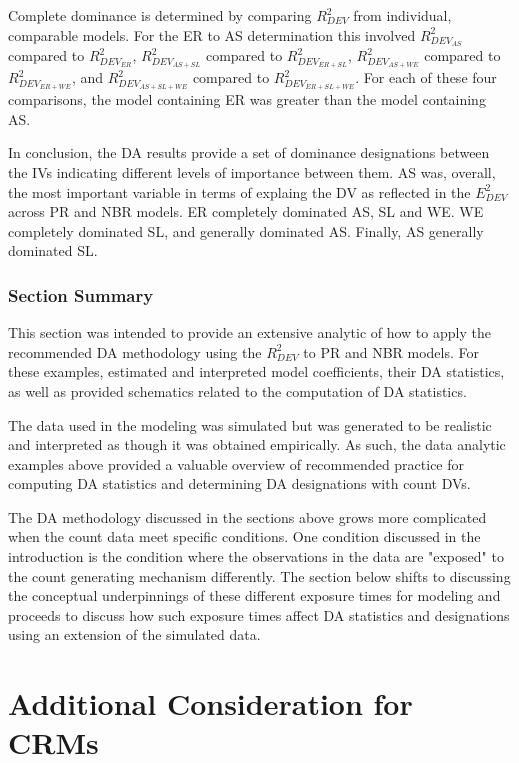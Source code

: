 \documentclass[ShortAfour,times,sageapa]{sagej}
\begin{document}
	Complete dominance is determined by comparing $R^2_{DEV}$ from individual, comparable models.
	For the ER to AS determination this involved $R^2_{DEV_{AS}}$ compared to $R^2_{DEV_{ER}}$, $R^2_{DEV_{AS + SL}}$ compared to $R^2_{DEV_{ER + SL}}$, $R^2_{DEV_{AS + WE}}$ compared to $R^2_{DEV_{ER + WE}}$, and $R^2_{DEV_{AS + SL + WE}}$ compared to $R^2_{DEV_{ER + SL + WE}}$.
	For each of these four comparisons, the model containing ER was greater than the model containing AS.
	
	In conclusion, the DA results provide a set of dominance designations between the IVs indicating different levels of importance between them. 
	AS was, overall, the most important variable in terms of explaing the DV as reflected in the $E^2_{DEV}$ across PR and NBR models. 
	ER completely dominated AS, SL and WE.
	WE completely dominated SL, and generally dominated AS.
	Finally, AS generally dominated SL.

	\subsubsection{Section Summary}
	
	This section was intended to provide an extensive analytic of how to apply the recommended DA methodology using the $R^2_{DEV}$ to PR and NBR models.
	For these examples, estimated and interpreted model coefficients, their DA statistics, as well as provided schematics related to the computation of DA statistics.
	
	The data used in the modeling was simulated but was generated to be realistic and interpreted as though it was obtained empirically.
	As such, the data analytic examples above provided a valuable overview of recommended practice for computing DA statistics and determining DA designations with count DVs.
	
	The DA methodology discussed in the sections above grows more complicated when the count data meet specific conditions. 
	One condition discussed in the introduction is the condition where the observations in the data are "exposed" to the count generating mechanism differently.
	The section below shifts to discussing the conceptual underpinnings of these different exposure times for modeling and proceeds to discuss how such exposure times affect DA statistics and designations using an extension of the simulated data.
	
\section{Additional Consideration for CRMs}
\end{document}
